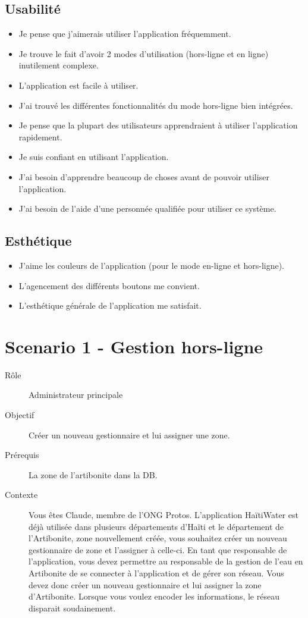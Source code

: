 \documentclass{EPL-master-thesis-covers-FR}
\begin{document}
				\subsection*{Usabilité}
					\begin{itemize}
						\item Je pense que j'aimerais utiliser l'application fréquemment.
						\item Je trouve le fait d'avoir 2 modes d'utilisation (hors-ligne et en ligne) inutilement complexe.
						\item L'application est facile à utiliser.
						\item J'ai trouvé les différentes fonctionnalités du mode hors-ligne bien intégrées.
						\item Je pense que la plupart des utilisateurs apprendraient à utiliser l'application rapidement.
						\item Je suis confiant en utilisant l'application.
						\item J'ai besoin d'apprendre beaucoup de choses avant de pouvoir utiliser l'application.
						\item J'ai besoin de l'aide d'une personnée qualifiée pour utiliser ce système.
					\end{itemize}
				\subsection*{Esthétique}
					\begin{itemize}
						\item J'aime les couleurs de l'application (pour le mode en-ligne et hors-ligne).
						\item L'agencement des différents boutons me convient.
						\item L'esthétique générale de l'application me satisfait.				
					\end{itemize}
					
\newpage
			\section{Scenario 1 - Gestion hors-ligne}
				\begin{description}
					\item[Rôle] Administrateur principale
					\item[Objectif] Créer un nouveau gestionnaire et lui assigner une zone. 
					\item[Prérequis] La zone de l'artibonite dans la DB.
					\item[Contexte] Vous êtes Claude, membre de l’ONG Protos. L’application HaïtiWater est déjà utilisée dans plusieurs départements d’Haïti et le département de l’Artibonite, zone nouvellement créée, vous souhaitez créer un nouveau gestionnaire de zone et l’assigner à celle-ci. En tant que responsable de l’application, vous devez permettre au responsable de la gestion de l’eau en Artibonite de se connecter à l’application et de gérer son réseau. Vous devez donc créer un nouveau gestionnaire et lui assigner la zone d’Artibonite. Lorsque vous voulez encoder les informations, le réseau disparait soudainement. 
				\end{description}
							
\end{document}
